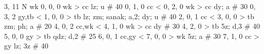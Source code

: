 %
3, 11 %
N %
wk
%
0, 0, 0
wk > cc
lz; u # 40
%
0, 1, 0
cc < 
%
0, 2, 0
wk > cc
dy; a # 30
%
0, 3, 2
gy,tb < 
%
1, 0, 0
 > tb
lz; zm; sanak; a,2; dy; u # 40
%
2, 0, 1
cc < 
%
3, 0, 0
 > tb
zm; ph; a # 20
%
4, 0, 2
cc,wk < 
%
4, 1, 0
wk > cc
dy # 30
%
4, 2, 0
 > tb
5z; d,3 # 40
%
5, 0, 0
gy > tb
qdz; d,2 # 25
%
6, 0, 1
cc,gy < 
%
7, 0, 0
 > wk
5z; a # 30
%
7, 1, 0
cc > gy
lz; 3z # 40